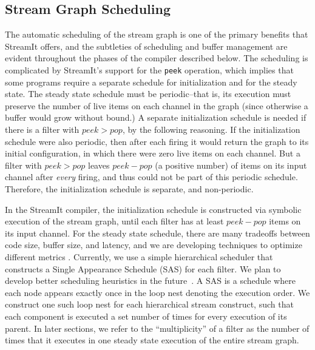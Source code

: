 \subsection{Stream Graph Scheduling}
The automatic scheduling of the stream graph is one of the primary
benefits that StreamIt offers, and the subtleties of scheduling and
buffer management are evident throughout the phases
of the compiler described below.  The scheduling is complicated by StreamIt's support
for the {\tt peek} operation, which implies that some programs require
a separate schedule for initialization and for the steady state.  The
steady state schedule must be periodic--that is, its execution must
preserve the number of live items on each channel in the graph (since
otherwise a buffer would grow without bound.)  A separate
initialization schedule is needed if there is a filter with $peek >
pop$, by the following reasoning.  If the initialization schedule were
also periodic, then after each firing it would return the graph to its
initial configuration, in which there were zero live items on each
channel.  But a filter with $peek > pop$ leaves $peek-pop$ (a positive
number) of items on its input channel after {\it every} firing, and
thus could not be part of this periodic schedule.  Therefore, the
initialization schedule is separate, and non-periodic.

In the StreamIt compiler, the initialization schedule is constructed
via symbolic execution of the stream graph, until each filter has at
least $peek-pop$ items on its input channel.  For the steady state
schedule, there are many tradeoffs between code size, buffer size, and
latency, and we are developing techniques to optimize different
metrics \cite{streamittech2}.  Currently, we use a simple hierarchical
scheduler that constructs a Single Appearance Schedule (SAS)
\cite{leesdf} for each filter.  We plan to develop better scheduling
heuristics in the future~\cite{Karczma-thesis}.  A SAS is a schedule
where each node appears exactly once in the loop nest denoting the
execution order.  We construct one such loop nest for each
hierarchical stream construct, such that each component is executed a
set number of times for every execution of its parent.  In later
sections, we refer to the ``multiplicity'' of a filter as the number
of times that it executes in one steady state execution of the entire
stream graph.

